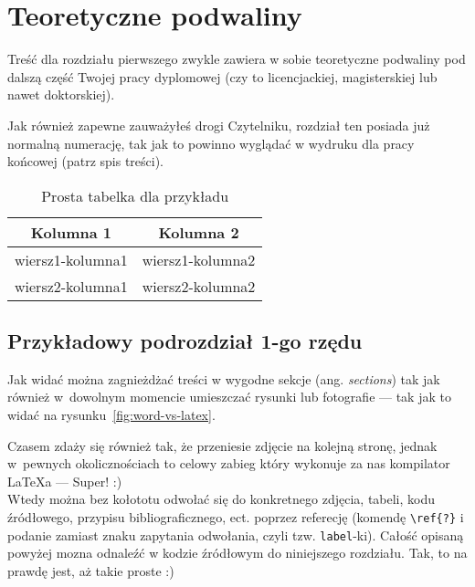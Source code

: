 \chapter{Teoretyczne podwaliny}
\label{chap:teoretyczne_podwaliny}

Treść dla rozdziału pierwszego zwykle zawiera w sobie teoretyczne podwaliny pod dalszą część Twojej pracy dyplomowej (czy to licencjackiej, magisterskiej lub nawet doktorskiej). 

Jak również zapewne zauważyłeś drogi Czytelniku, rozdział ten posiada już normalną numerację, tak jak to powinno wyglądać w wydruku dla pracy końcowej (patrz spis treści).

\begin{table}[!h]
    \centering
    \begin{tabular}{|c|c|}
    \hline
    \textbf{Kolumna 1} & \textbf{Kolumna 2} \\ \hline \hline
    wiersz1-kolumna1 & wiersz1-kolumna2 \\ \hline
    wiersz2-kolumna1 & wiersz2-kolumna2 \\ \hline
    \end{tabular}
\caption{Prosta tabelka dla przykładu}
\label{tab:tab:prosta-tabela-przyklad-A}
\end{table}


\section{Przykładowy podrozdział 1-go rzędu}
Jak widać można zagnieżdżać treści w wygodne sekcje (ang. \textit{sections}) tak jak również w~dowolnym momencie umieszczać rysunki lub fotografie --- tak jak to widać na rysunku~\ref{fig:word-vs-latex}.


Czasem zdaży się również tak, że przeniesie zdjęcie na kolejną stronę, jednak w~pewnych okolicznościach to celowy zabieg który wykonuje za nas kompilator LaTeXa --- Super! :) \\
Wtedy można bez kołototu odwołać się do konkretnego zdjęcia, tabeli, kodu źródłowego, przypisu bibliograficznego, ect. poprzez referecję (komendę \texttt{\textbackslash{}ref\{?\}} i podanie zamiast znaku zapytania odwołania, czyli tzw. \texttt{label}-ki). Całość opisaną powyżej mozna odnaleźć w kodzie źródłowym do niniejszego rozdziału. Tak, to na prawdę jest, aż takie proste :)

